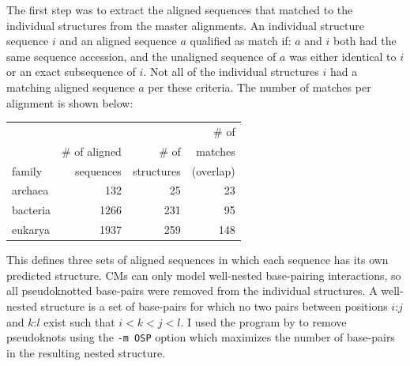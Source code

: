 The first step was to extract the aligned sequences that matched to
the individual structures from the master alignments.  An individual
structure sequence $i$ and an aligned sequence $a$ qualified as match
if: $a$ and $i$ both had the same sequence accession, and the
unaligned sequence of $a$ was either identical to $i$ or an exact
subsequence of $i$.  Not all of the individual structures $i$ had a
matching aligned sequence $a$ per these criteria.  The number of
matches per alignment is shown below:

\begin{center}
\begin{tabular}{l|r|r|r}
             &               &            & \# of   \\ 
             & \# of aligned & \# of      & matches  \\ 
family       & sequences     & structures & (overlap) \\ \hline%
archaea      &           132 &         25 &  23      \\%
bacteria     &          1266 &        231 &  95      \\%
eukarya      &          1937 &        259 & 148      \\%
\end{tabular}
\end{center}

This defines three sets of aligned sequences in which each sequence 
has its own predicted structure. CMs can only model well-nested
base-pairing interactions, so all pseudoknotted base-pairs
were removed from the individual structures. A well-nested structure
is a set of base-pairs for which no two pairs between positions $i$:$j$
and $k$:$l$ exist such that $i<k<j<l$. I used the program
 by \cite{Smit08} to remove
pseudoknots using the \texttt{-m OSP} option which maximizes the number
of base-pairs in the resulting nested structure.

